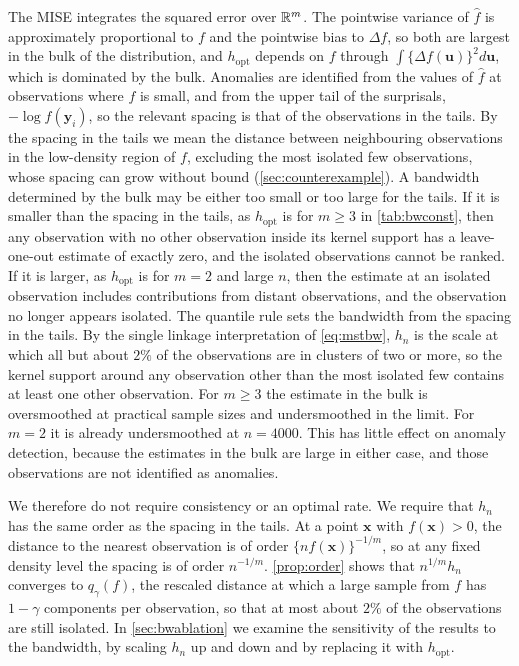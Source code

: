 The MISE integrates the squared error over $\mathbb{R}^m$. The pointwise variance of $\hat f$ is approximately proportional to $f$ and the pointwise bias to $\Delta f$, so both are largest in the bulk of the distribution, and $h_{\text{opt}}$ depends on $f$ through $\int\{\Delta f(\bm{u})\}^2d\bm{u}$, which is dominated by the bulk. Anomalies are identified from the values of $\hat f$ at observations where $f$ is small, and from the upper tail of the surprisals, $-\log\hat f(\bm{y}_i)$, so the relevant spacing is that of the observations in the tails. By the spacing in the tails we mean the distance between neighbouring observations in the low-density region of $f$, excluding the most isolated few observations, whose spacing can grow without bound (\cref{sec:counterexample}). A bandwidth determined by the bulk may be either too small or too large for the tails. If it is smaller than the spacing in the tails, as $h_{\text{opt}}$ is for $m\ge3$ in \cref{tab:bwconst}, then any observation with no other observation inside its kernel support has a leave-one-out estimate of exactly zero, and the isolated observations cannot be ranked. If it is larger, as $h_{\text{opt}}$ is for $m=2$ and large $n$, then the estimate at an isolated observation includes contributions from distant observations, and the observation no longer appears isolated. The quantile rule sets the bandwidth from the spacing in the tails. By the single linkage interpretation of \eqref{eq:mstbw}, $h_n$ is the scale at which all but about $2\%$ of the observations are in clusters of two or more, so the kernel support around any observation other than the most isolated few contains at least one other observation. For $m\ge3$ the estimate in the bulk is oversmoothed at practical sample sizes and undersmoothed in the limit. For $m=2$ it is already undersmoothed at $n=4000$. This has little effect on anomaly detection, because the estimates in the bulk are large in either case, and those observations are not identified as anomalies.

We therefore do not require consistency or an optimal rate. We require that $h_n$ has the same order as the spacing in the tails. At a point $\bm{x}$ with $f(\bm{x})>0$, the distance to the nearest observation is of order $\{nf(\bm{x})\}^{-1/m}$, so at any fixed density level the spacing is of order $n^{-1/m}$. \cref{prop:order} shows that $n^{1/m}h_n$ converges to $q_\gamma(f)$, the rescaled distance at which a large sample from $f$ has $1-\gamma$ components per observation, so that at most about $2\%$ of the observations are still isolated. In \cref{sec:bwablation} we examine the sensitivity of the results to the bandwidth, by scaling $h_n$ up and down and by replacing it with $h_{\text{opt}}$.

